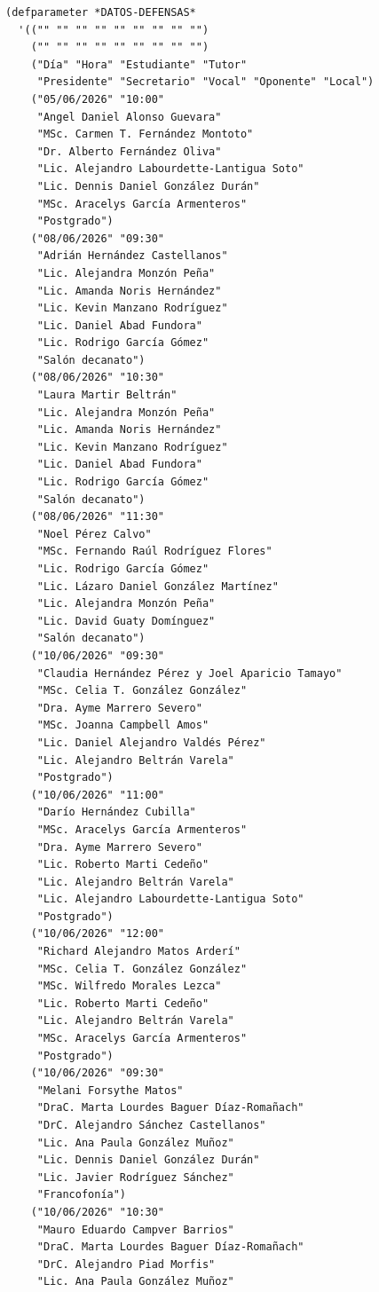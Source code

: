 \documentclass[12pt,a4paper]{report}
\begin{document}
\begin{lstlisting}[caption={Datos de defensas-table (13 defensas).}]
(defparameter *DATOS-DEFENSAS*
  '(("" "" "" "" "" "" "" "" "")
    ("" "" "" "" "" "" "" "" "")
    ("Día" "Hora" "Estudiante" "Tutor"
     "Presidente" "Secretario" "Vocal" "Oponente" "Local")
    ("05/06/2026" "10:00"
     "Angel Daniel Alonso Guevara"
     "MSc. Carmen T. Fernández Montoto"
     "Dr. Alberto Fernández Oliva"
     "Lic. Alejandro Labourdette-Lantigua Soto"
     "Lic. Dennis Daniel González Durán"
     "MSc. Aracelys García Armenteros"
     "Postgrado")
    ("08/06/2026" "09:30"
     "Adrián Hernández Castellanos"
     "Lic. Alejandra Monzón Peña"
     "Lic. Amanda Noris Hernández"
     "Lic. Kevin Manzano Rodríguez"
     "Lic. Daniel Abad Fundora"
     "Lic. Rodrigo García Gómez"
     "Salón decanato")
    ("08/06/2026" "10:30"
     "Laura Martir Beltrán"
     "Lic. Alejandra Monzón Peña"
     "Lic. Amanda Noris Hernández"
     "Lic. Kevin Manzano Rodríguez"
     "Lic. Daniel Abad Fundora"
     "Lic. Rodrigo García Gómez"
     "Salón decanato")
    ("08/06/2026" "11:30"
     "Noel Pérez Calvo"
     "MSc. Fernando Raúl Rodríguez Flores"
     "Lic. Rodrigo García Gómez"
     "Lic. Lázaro Daniel González Martínez"
     "Lic. Alejandra Monzón Peña"
     "Lic. David Guaty Domínguez"
     "Salón decanato")
    ("10/06/2026" "09:30"
     "Claudia Hernández Pérez y Joel Aparicio Tamayo"
     "MSc. Celia T. González González"
     "Dra. Ayme Marrero Severo"
     "MSc. Joanna Campbell Amos"
     "Lic. Daniel Alejandro Valdés Pérez"
     "Lic. Alejandro Beltrán Varela"
     "Postgrado")
    ("10/06/2026" "11:00"
     "Darío Hernández Cubilla"
     "MSc. Aracelys García Armenteros"
     "Dra. Ayme Marrero Severo"
     "Lic. Roberto Marti Cedeño"
     "Lic. Alejandro Beltrán Varela"
     "Lic. Alejandro Labourdette-Lantigua Soto"
     "Postgrado")
    ("10/06/2026" "12:00"
     "Richard Alejandro Matos Arderí"
     "MSc. Celia T. González González"
     "MSc. Wilfredo Morales Lezca"
     "Lic. Roberto Marti Cedeño"
     "Lic. Alejandro Beltrán Varela"
     "MSc. Aracelys García Armenteros"
     "Postgrado")
    ("10/06/2026" "09:30"
     "Melani Forsythe Matos"
     "DraC. Marta Lourdes Baguer Díaz-Romañach"
     "DrC. Alejandro Sánchez Castellanos"
     "Lic. Ana Paula González Muñoz"
     "Lic. Dennis Daniel González Durán"
     "Lic. Javier Rodríguez Sánchez"
     "Francofonía")
    ("10/06/2026" "10:30"
     "Mauro Eduardo Campver Barrios"
     "DraC. Marta Lourdes Baguer Díaz-Romañach"
     "DrC. Alejandro Piad Morfis"
     "Lic. Ana Paula González Muñoz"

\end{lstlisting}
\end{document}
